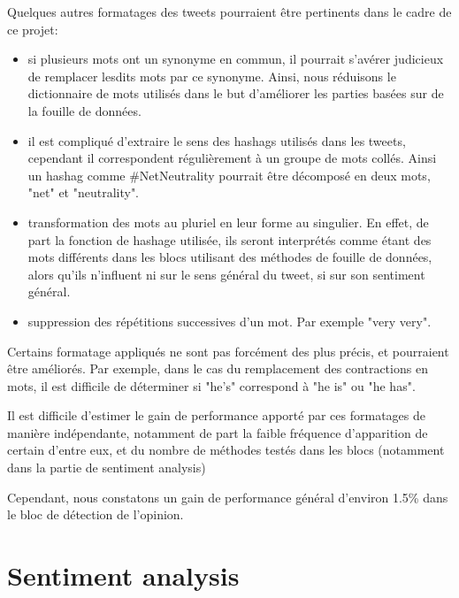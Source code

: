 \par Quelques autres formatages des tweets pourraient être pertinents dans le cadre de ce projet: \\
\begin{itemize}
  \item si plusieurs mots ont un synonyme en commun, il pourrait s'avérer judicieux de remplacer lesdits mots par ce synonyme. Ainsi, nous réduisons le dictionnaire de mots utilisés dans le but d'améliorer les parties basées sur de la fouille de données.
  \item il est compliqué d'extraire le sens des hashags utilisés dans les tweets, cependant il correspondent régulièrement à un groupe de mots collés. Ainsi un hashag comme \#NetNeutrality pourrait être décomposé en deux mots, "net" et "neutrality".
  \item transformation des mots au pluriel en leur forme au singulier. En effet, de part la fonction de hashage utilisée, ils seront interprétés comme étant des mots différents dans les blocs utilisant des méthodes de fouille de données, alors qu'ils n'influent ni sur le sens général du tweet, si sur son sentiment général.
  \item suppression des répétitions successives d'un mot. Par exemple "very very". \\
\end{itemize}

\par Certains formatage appliqués ne sont pas forcément des plus précis, et pourraient être améliorés. Par exemple, dans le cas du remplacement des contractions en mots, il est difficile de déterminer si "he's" correspond à "he is" ou "he has".

\par Il est difficile d'estimer le gain de performance apporté par ces formatages de manière indépendante, notamment de part la faible fréquence d'apparition de certain d'entre eux, et du nombre de méthodes testés dans les blocs (notamment dans la partie de sentiment analysis)\\

\par Cependant, nous constatons un gain de performance général d'environ 1.5\% dans le bloc de détection de l'opinion.

\section{Sentiment analysis}

